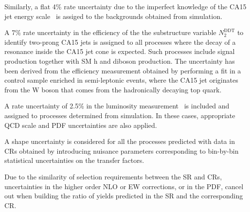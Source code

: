 Similarly, a flat 4\% rate uncertainty due to the imperfect knowledge of the CA15 jet energy scale~\cite{jec} is assiged to the backgrounds obtained from simulation.

A 7\% rate uncertainty in the efficiency of the the substructure variable
$N_2^\text{DDT}$ to identify two-prong CA15 jets is assigned to all processes where the decay of a resonance inside the CA15 jet cone is expected. Such processes include signal production together with SM h and diboson production.  
The uncertainty has been derived from the efficiency measurement obtained by performing a fit in a control sample
enriched in semi-leptonic \ttbar events, where the CA15 jet originates
from the W boson that comes from the hadronically decaying top quark. 
%

A rate uncertainty of 2.5\% in the luminosity measurement~\cite{CMS-PAS-LUM-17-001} is included and assigned to processes determined from simulation. In these cases, appropriate QCD scale and PDF uncertainties are also applied.
%

A shape uncertainty is considered for all the processes predicted with data in CRs obtained by introducing nuisance parameters corresponding to bin-by-bin statistical uncertainties on the transfer factors. 
%

Due to the similarity of selection requirements between the SR and CRs, uncertainties in the higher order NLO or EW corrections, or in the PDF, cancel out when building the ratio of yields predicted in the SR and the corresponding CR.


